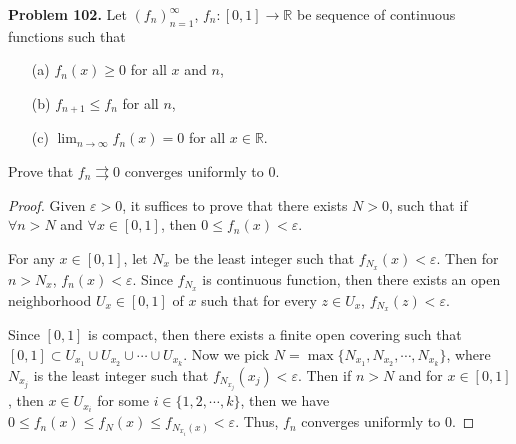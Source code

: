 \documentclass[12pt,leqno]{amsart}
\theoremstyle{definition}
\numberwithin{equation}{subsection}
\begin{document}
\noindent
{\bf Problem 102.}
Let $(f_n)_{n=1}^\infty$, $f_n:[0,1]\to\mathbb{R}$ be sequence of continuous functions such that
\begin{itemize}
\item[(a)] $f_n(x)\geq 0$ for all $x$ and $n$,
\item[(b)] $f_{n+1}\leq f_n$ for all $n$,
\item[(c)] $\displaystyle\lim_{n\to\infty} f_n(x)=0$ for all $x\in\mathbb{R}$.
\end{itemize}
Prove that $f_n\rightrightarrows 0$ converges uniformly to $0$.
\begin{proof}
Given $\varepsilon > 0$, it suffices to prove that there exists $N > 0$, such that if $\forall n > N$ and $\forall x\in[0,1]$, then $0\leq f_n(x) < \varepsilon$. 

For any $x\in[0,1]$, let $N_x$ be the least integer such that $f_{N_x}(x) < \varepsilon$. Then for $n > N_x$, $f_n(x) < \varepsilon$. Since $f_{N_x}$ is continuous function, then there exists an open neighborhood $U_x\in[0,1]$ of $x$ such that for every $z\in U_x$, $f_{N_x}(z) < \varepsilon$. 

Since $[0,1]$ is compact, then there exists a finite open covering such that $[0,1]\subset U_{x_1}\cup U_{x_2}\cup \cdots \cup U_{x_k}$. Now we pick $N = \max\{N_{x_1}, N_{x_2},\cdots, N_{x_k}\}$, where $N_{x_j}$ is the least integer such that $f_N_{x_j}(x_j) < \varepsilon$. Then if $n > N$ and for $x\in[0,1]$, then $x\in U_{x_i}$ for some $i\in\{1,2,\cdots,k\}$, then we have $0\leq f_n(x) \leq f_N(x) \leq f_{N_{x_i}(x)} < \varepsilon$. Thus, $f_n$ converges uniformly to $0$.
\end{proof}

\medskip
\end{document}
